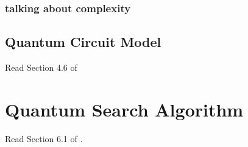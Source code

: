 \documentclass[a4paper,10pt]{article}
\numberwithin{equation}{subsection}
\begin{document}
\subsubsection{talking about complexity}




\subsection{Quantum Circuit Model}

Read Section 4.6 of



\section{Quantum Search Algorithm}

Read Section 6.1 of \cite{nielsen2010}.




\end{document}
